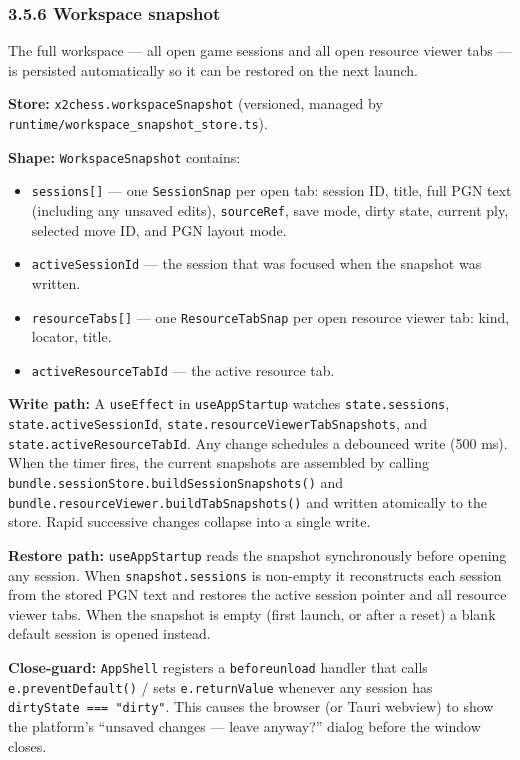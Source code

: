 \documentclass[]{article}
\providecommand{\tightlist}{%
  \setlength{\itemsep}{0pt}\setlength{\parskip}{0pt}}
\begin{document}
\subsubsection{3.5.6 Workspace snapshot}\label{workspace-snapshot}

The full workspace --- all open game sessions and all open resource
viewer tabs --- is persisted automatically so it can be restored on the
next launch.

\textbf{Store:} \texttt{x2chess.workspaceSnapshot} (versioned, managed
by \texttt{runtime/workspace\_snapshot\_store.ts}).

\textbf{Shape:} \texttt{WorkspaceSnapshot} contains:

\begin{itemize}
\tightlist
\item
  \texttt{sessions{[}{]}} --- one \texttt{SessionSnap} per open tab:
  session ID, title, full PGN text (including any unsaved edits),
  \texttt{sourceRef}, save mode, dirty state, current ply, selected move
  ID, and PGN layout mode.
\item
  \texttt{activeSessionId} --- the session that was focused when the
  snapshot was written.
\item
  \texttt{resourceTabs{[}{]}} --- one \texttt{ResourceTabSnap} per open
  resource viewer tab: kind, locator, title.
\item
  \texttt{activeResourceTabId} --- the active resource tab.
\end{itemize}

\textbf{Write path:} A \texttt{useEffect} in \texttt{useAppStartup}
watches \texttt{state.sessions}, \texttt{state.activeSessionId},
\texttt{state.resourceViewerTabSnapshots}, and
\texttt{state.activeResourceTabId}. Any change schedules a debounced
write (500 ms). When the timer fires, the current snapshots are
assembled by calling
\texttt{bundle.sessionStore.buildSessionSnapshots()} and
\texttt{bundle.resourceViewer.buildTabSnapshots()} and written
atomically to the store. Rapid successive changes collapse into a single
write.

\textbf{Restore path:} \texttt{useAppStartup} reads the snapshot
synchronously before opening any session. When
\texttt{snapshot.sessions} is non-empty it reconstructs each session
from the stored PGN text and restores the active session pointer and all
resource viewer tabs. When the snapshot is empty (first launch, or after
a reset) a blank default session is opened instead.

\textbf{Close-guard:} \texttt{AppShell} registers a
\texttt{beforeunload} handler that calls \texttt{e.preventDefault()} /
sets \texttt{e.returnValue} whenever any session has
\texttt{dirtyState\ ===\ "dirty"}. This causes the browser (or Tauri
webview) to show the platform's ``unsaved changes --- leave anyway?''
dialog before the window closes.
\end{document}
